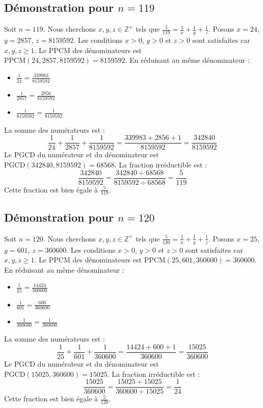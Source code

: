 \documentclass[11pt,a4paper]{article}
\begin{document}
\subsection{Démonstration pour $n = 119$}
Soit $n = 119$. Nous cherchons $x, y, z \in \mathbb{Z}^{+}$ tels que $\frac{5}{119} = \frac{1}{x} + \frac{1}{y} + \frac{1}{z}$.
Posons $x = 24$, $y = 2857$, $z = 8159592$.
Les conditions $x > 0$, $y > 0$ et $z > 0$ sont satisfaites car $x, y, z \geq 1$.
Le PPCM des dénominateurs est $\text{PPCM}(24, 2857, 8159592) = 8159592$.
En réduisant au même dénominateur :
\begin{itemize}
    \item $\frac{1}{24} = \frac{339983}{8159592}$
    \item $\frac{1}{2857} = \frac{2856}{8159592}$
    \item $\frac{1}{8159592} = \frac{1}{8159592}$
\end{itemize}
La somme des numérateurs est :
$$ \frac{1}{24} + \frac{1}{2857} + \frac{1}{8159592} = \frac{339983 + 2856 + 1}{8159592} = \frac{342840}{8159592} $$
Le PGCD du numérateur et du dénominateur est $\text{PGCD}(342840, 8159592) = 68568$.
La fraction irréductible est :
$$ \frac{342840}{8159592} = \frac{342840 \div 68568}{8159592 \div 68568} = \frac{5}{119} $$
Cette fraction est bien égale à $\frac{5}{119}$.

\subsection{Démonstration pour $n = 120$}
Soit $n = 120$. Nous cherchons $x, y, z \in \mathbb{Z}^{+}$ tels que $\frac{5}{120} = \frac{1}{x} + \frac{1}{y} + \frac{1}{z}$.
Posons $x = 25$, $y = 601$, $z = 360600$.
Les conditions $x > 0$, $y > 0$ et $z > 0$ sont satisfaites car $x, y, z \geq 1$.
Le PPCM des dénominateurs est $\text{PPCM}(25, 601, 360600) = 360600$.
En réduisant au même dénominateur :
\begin{itemize}
    \item $\frac{1}{25} = \frac{14424}{360600}$
    \item $\frac{1}{601} = \frac{600}{360600}$
    \item $\frac{1}{360600} = \frac{1}{360600}$
\end{itemize}
La somme des numérateurs est :
$$ \frac{1}{25} + \frac{1}{601} + \frac{1}{360600} = \frac{14424 + 600 + 1}{360600} = \frac{15025}{360600} $$
Le PGCD du numérateur et du dénominateur est $\text{PGCD}(15025, 360600) = 15025$.
La fraction irréductible est :
$$ \frac{15025}{360600} = \frac{15025 \div 15025}{360600 \div 15025} = \frac{1}{24} $$
Cette fraction est bien égale à $\frac{5}{120}$.
\end{document}
